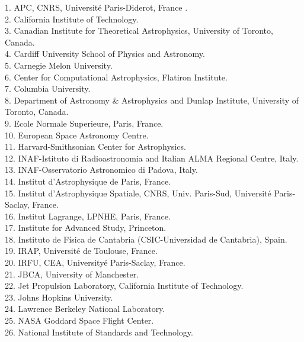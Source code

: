 \documentclass[PICOReport.tex]{subfiles}
\begin{document}
\begin{multicols}{2}
\raggedright 
\scriptsize {
1. APC, CNRS, Universit\'e Paris-Diderot, France .  \\
2. California Institute of Technology.  \\
3. Canadian Institute for Theoretical Astrophysics, University of Toronto, Canada.  \\
4. Cardiff University School of Physics and Astronomy.  \\
5. Carnegie Melon University.  \\
6. Center for Computational Astrophysics, Flatiron Institute.  \\
7. Columbia University.  \\
8. Department of Astronomy \& Astrophysics and Dunlap Institute, University of Toronto, Canada.  \\
9. Ecole Normale Superieure, Paris, France.  \\
10. European Space Astronomy Centre.  \\
11. Harvard-Smithsonian Center for Astrophysics.  \\
12. INAF-Istituto di Radioastronomia and Italian ALMA Regional Centre, Italy.  \\
13. INAF-Osservatorio Astronomico di Padova, Italy.  \\
14. Institut d'Astrophysique de Paris, France.  \\
15. Institut d'Astrophysique Spatiale, CNRS, Univ. Paris-Sud, Universit\'e Paris-Saclay, France.  \\
16. Institut Lagrange, LPNHE,  Paris, France.  \\
17. Institute for Advanced Study, Princeton.  \\
18. Instituto de F\'isica de Cantabria (CSIC-Universidad de Cantabria), Spain.  \\
19. IRAP, Universit\'e de Toulouse, France.  \\
20. IRFU, CEA, University\'e Paris-Saclay, France.  \\
21. JBCA, University of Manchester.  \\
22. Jet Propulsion Laboratory, California Institute of Technology.  \\
23. Johns Hopkins University.  \\
24. Lawrence Berkeley National Laboratory.  \\
25. NASA Goddard Space Flight Center.  \\
26. National Institute of Standards and Technology.  \\
}
\end{multicols}
\end{document}
